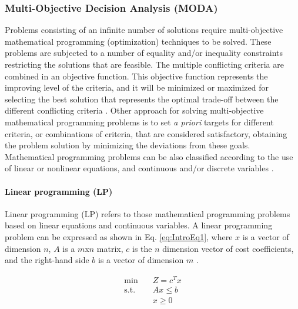 \begin{refsection}[referencesCh1]
\subsubsection{Multi-Objective Decision Analysis (MODA)}

Problems consisting of an infinite number of solutions require multi-objective mathematical programming (optimization) techniques to be solved. These problems are subjected to a number of equality and/or inequality constraints restricting the solutions that are feasible.
The multiple conflicting criteria are combined in an objective function. This objective function represents the improving level of the criteria, and it will be minimized or maximized for selecting the best solution that represents the optimal trade-off between the different conflicting criteria \citep{giove2009decision}.
Other approach for solving multi-objective mathematical programming problems is to set \textit{a priori} targets for different criteria, or combinations of criteria, that are considered satisfactory, obtaining the problem solution by minimizing the deviations from these goals. Mathematical programming problems can be also classified according to the use of linear or nonlinear equations, and continuous and/or discrete variables \citep{giove2009decision}.

\paragraph{Linear programming (LP)}
Linear programming (LP) refers to those mathematical programming problems based on linear equations and continuous variables. A linear programming problem can be expressed as shown in Eq. \ref{eq:IntroEq1},  where $x$ is a vector of dimension $n$, $A$ is a $m$x$n$ matrix, $c$ is the $n$ dimension vector of cost coefficients, and the right-hand side $b$ is a vector of dimension $m$ \citep{grossmann2021advanced}.

\begin{align}
	\min \quad & Z=c^{T}x \nonumber\\
	\textrm{s.t.} \quad & Ax \leq b \label{eq:IntroEq1}\\
	&x \geq 0  \nonumber  
\end{align}


\end{refsection}
